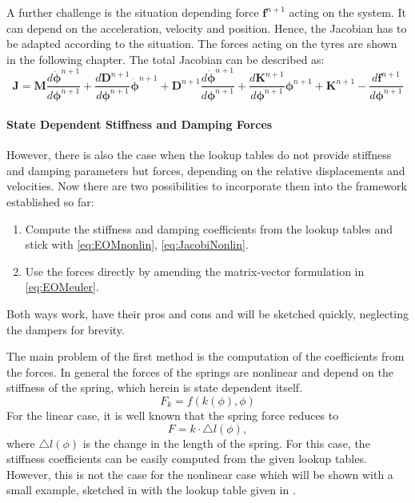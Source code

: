 \noindent A further challenge is the situation depending force $\boldsymbol{f}^{n+1}$ acting on the system. It can depend on the acceleration, velocity and position. Hence, the Jacobian has to be adapted according to the situation. The forces acting on the tyres are shown in the following chapter. The total Jacobian can be described as:
\begin{equation}\label{eq:JacobiNonlin}
	\boldsymbol{J} = \boldsymbol{M} 
	\frac{d \ddot{\boldsymbol{\phi}}^{n+1}}{d \boldsymbol{\phi}^{n+1}} 
	+ \frac{d \boldsymbol{D}^{n+1}}{d \boldsymbol{\phi}^{n+1}} \dot{\boldsymbol{\phi}}^{n+1} + \boldsymbol{D}^{n+1} \frac{d \dot{\boldsymbol{\phi}}^{n+1}}{d \boldsymbol{\phi}^{n+1}} + \frac{d \boldsymbol{K}^{n+1}}{d \boldsymbol{\phi}^{n+1}} \boldsymbol{\phi}^{n+1} + \boldsymbol{K}^{n+1}  - \frac{d \boldsymbol{f}^{n+1}}{d \boldsymbol{\phi}^{n+1}}
\end{equation}

\paragraph{State Dependent Stiffness and Damping Forces} \label{par:NonlinearSpringForce}
However, there is also the case when the lookup tables do not provide stiffness and damping parameters but forces, depending on the relative displacements and velocities. Now there are two possibilities to incorporate them into the framework established so far:
\begin{enumerate}
	\item Compute the stiffness and damping coefficients from the lookup tables and stick with \eqref{eq:EOMnonlin}, \eqref{eq:JacobiNonlin}.
	\item Use the forces directly by amending the matrix-vector formulation in \eqref{eq:EOMeuler}.
\end{enumerate}
Both ways work, have their pros and cons and will be sketched quickly, neglecting the dampers for brevity. 

The main problem of the first method is the computation of the coefficients from the forces. In general the forces of the springs are nonlinear and depend on the stiffness of the spring, which herein is state dependent itself.
\begin{equation}
	F_k = f(k(\phi),\phi)
\end{equation}
For the linear case, it is well known that the spring force reduces to
\begin{equation}\label{eq:SpringForceLinear}
	F=k\cdot\triangle l(\phi),
\end{equation}  
where $\triangle l(\phi)$ is the change in the length of the spring. 
For this case, the stiffness coefficients can be easily computed from the given lookup tables. 
However, this is not the case for the nonlinear case which will be shown with a small example, sketched in  with the lookup table given in . 

